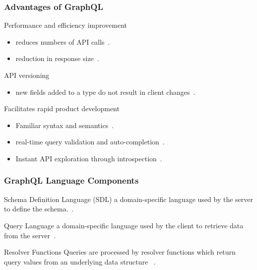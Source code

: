 \begin{frame}\frametitle{Advantages of GraphQL}

\begin{block}{Performance and efficiency improvement}
\begin{itemize}
  \item reduces numbers of API calls~\cite{migrating-to-gql}.
  \item reduction in response size~\cite{migrating-to-gql}.
\end{itemize}
\end{block}

\begin{block}{API versioning}
\begin{itemize}
  \item new fields added to a type do not result in client changes~\cite{migrating-to-gql}. 
\end{itemize}

\end{block}

\begin{block}{Facilitates rapid product development}
\begin{itemize}
  \item  Familiar syntax and semantics~\cite{rest-vs-gql-controlled-experiment}.
  \item real-time query validation and auto-completion~\cite{rest-vs-gql-controlled-experiment,migrating-to-gql}.
  \item Instant API exploration through introspection~\cite{migrating-to-gql}. 
\end{itemize}

\end{block}

\end{frame}

\begin{frame}\frametitle{GraphQL Language Components}

\begin{block}{Schema Definition Language (SDL)}
a domain-specific language used by the server to define the schema.~\cite{migrating-to-gql}.
\end{block}

\begin{block}{Query Language}
a domain-specific language used by the client to retrieve data from the server~\cite{initial-analysis-of-gql}. 
\end{block}

\begin{block}{Resolver Functions}
Queries are processed by resolver functions which return query values from an underlying data structure  ~\cite{migrating-to-gql}.
\end{block}

\end{frame}
